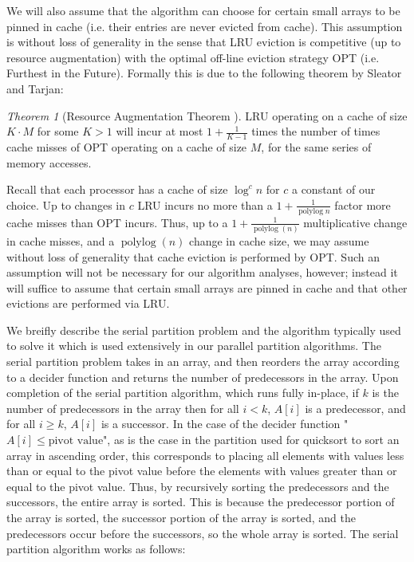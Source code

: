 \documentclass[11pt]{article}
\newcommand{\polylog}{\operatorname{polylog}}
\renewcommand{\paragraph}[1]{\vspace{0.09in}\noindent{\bf \boldmath #1.}}
\theoremstyle{remark}
\newtheorem{theorem}{Theorem}[section]
\theoremstyle{remark}
\begin{document}
We will also assume that the algorithm can choose for certain small
arrays to be pinned in cache (i.e. their entries are never evicted
from cache).  This assumption is without loss of generality in the
sense that LRU eviction is competitive (up to resource augmentation)
with the optimal off-line eviction strategy OPT (i.e. Furthest in the
Future). Formally this is due to the following theorem by Sleator and
Tarjan:
\begin{theorem}[Resource Augmentation Theorem \cite{SleatorTa85}]
  LRU operating on a cache of size $K\cdot M$ for some $K>1$ will incur at most $1+\frac{1}{K-1}$ times the number of times cache misses of OPT operating on a cache of size $M$, for the same series of memory accesses.
  \label{thm:augmentation}
\end{theorem}

Recall that each processor has a cache of size $\log^c n$ for $c$ a
constant of our choice.  Up to changes in $c$ LRU incurs no more than
a $1+\frac{1}{\operatorname{polylog}{n}}$ factor more cache misses
than OPT incurs. Thus, up to a $1 + \frac{1}{\polylog(n)}$
multiplicative change in cache misses, and a $\polylog(n)$ change in
cache size, we may assume without loss of generality that cache
eviction is performed by OPT. Such an assumption will not be necessary
for our algorithm analyses, however; instead it will suffice to assume
that certain small arrays are pinned in cache and that other evictions
are performed via LRU.



\paragraph{Serial Partition Problem}
We breifly describe the serial partition problem and the algorithm typically used to solve it which is used extensively in our parallel partition algorithms. 
The serial partition problem takes in an array, and then reorders the array according to a decider function and returns the number of predecessors in the array.
Upon completion of the serial partition algorithm, which runs fully in-place, if $k$ is the number of predecessors in the array then for all $i < k$, $A[i]$ is a predecessor, and for all $i \ge k$, $A[i]$ is a successor. 
In the case of the decider function "$A[i] \leq \text{pivot value}$", as is the case in the partition used for quicksort to sort an array in ascending order, this corresponds to placing all elements with values less than or equal to the pivot value before the elements with values greater than or equal to the pivot value.
Thus, by recursively sorting the predecessors and the successors, the entire array is sorted. 
This is because the predecessor portion of the array is sorted, the successor portion of the array is sorted, and the predecessors occur before the successors, so the whole array is sorted.
The serial partition algorithm works as follows: 
\end{document}
